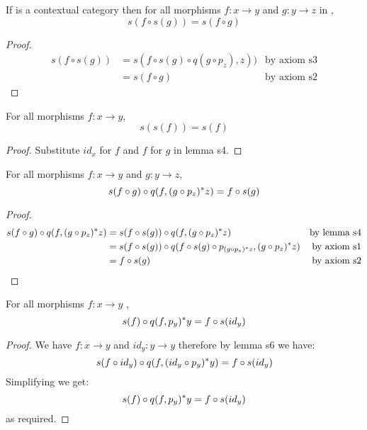 \documentclass[10pt,a4paper]{scrartcl}
\begin{document}
\begin{lemma} [lemma s4]
\label{s4}  
If  is a contextual category then for all morphisms $f: x \rightarrow y$ and $g:y \rightarrow z$ in ,
$$s(f \circ s(g)) = s(f \circ g)$$
\end{lemma}
\begin{proof}
\begin{align*}
s( f \circ s(g)) 
    & = s( f \circ s(g)\circ q(g \circ p_z) , z ))  &\mbox{by axiom s3}\\
    & = s(f \circ g) &\mbox{by axiom s2} 
\end{align*}
\end{proof}

\begin{lemma} [lemma s5]
\label{s5}  
For all morphisms $f: x \rightarrow y$,
$$s(s(f)) = s(f)$$
\end{lemma}
\begin{proof}

Substitute $id_x$ for $f$  and $f$ for $g$ in lemma s4.

\end{proof}


\begin{lemma} [lemma s6]
\label{s6}  
For all morphisms $f: x \rightarrow y$ and $g:y \rightarrow z$,
$$s( f \circ g) \circ q(f,  (g \circ p_z) ^* z )=f \circ s(g)$$
\end{lemma}
\begin{proof}
\begin{align*}
s( f \circ g) \circ q(f,  (g \circ p_z) ^* z )
    & = s( f \circ s(g)) \circ q(f,  (g \circ p_z) ^* z )  &\mbox{by lemma s4}\\
    & = s( f \circ s(g)) \circ q(f \circ s(g) \circ p_{(g \circ p_z) ^* z},  (g \circ p_z) ^* z )  &\mbox{by axiom s1}\\
		& = f \circ s(g)  &\mbox{by axiom s2}
\end{align*}
\end{proof}

\begin{lemma} 
\label{s7}  
For all morphisms $f: x \rightarrow y$ ,
$$s(f) \circ q(f,p_y ) ^* y =f \circ s(id_y)$$

\end{lemma}
\begin{proof}

We have $f: x \rightarrow y$ and $id_y:y \rightarrow y$ therefore by lemma s6 we
have:
$$s(f \circ id_y) \circ q(f, (id_y \circ p_y) ^* y )=f \circ s(id_y)$$
\noindent
Simplifying we get:
$$s(f) \circ q(f,p_y) ^* y =f \circ s(id_y)$$
as required.
\end{proof}
\end{document}

